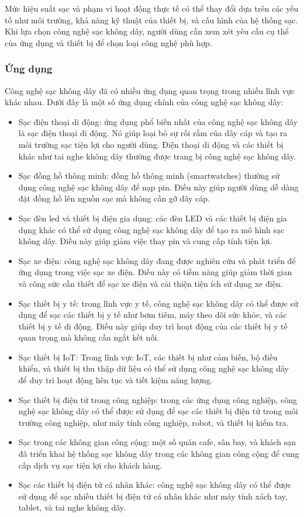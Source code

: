 \documentclass{article} %
\begin{document}
Mức hiệu suất sạc và phạm vi hoạt động thực tế có thể thay đổi dựa trên các yếu tố như môi trường, khả năng kỹ thuật của thiết bị, và cấu hình của hệ thống sạc. Khi lựa chọn công nghệ sạc không dây, người dùng cần xem xét yêu cầu cụ thể của ứng dụng và thiết bị để chọn loại công nghệ phù hợp.

\subsubsection{Ứng dụng}

Công nghệ sạc không dây đã có nhiều ứng dụng quan trọng trong nhiều lĩnh vực khác nhau. Dưới đây là một số ứng dụng chính của công nghệ sạc không dây:

\begin{itemize}
\item Sạc điện thoại di động: ứng dụng phổ biến nhất của công nghệ sạc không dây là sạc điện thoại di động. Nó giúp loại bỏ sự rối rắm của dây cáp và tạo ra môi trường sạc tiện lợi cho người dùng. Điện thoại di động và các thiết bị khác như tai nghe không dây thường được trang bị công nghệ sạc không dây.
\item Sạc đồng hồ thông minh: đồng hồ thông minh (smartwatches) thường sử dụng công nghệ sạc không dây để nạp pin. Điều này giúp người dùng dễ dàng đặt đồng hồ lên nguồn sạc mà không cần gỡ dây cáp.
\item Sạc đèn led và thiết bị điện gia dụng: các đèn LED và các thiết bị điện gia dụng khác có thể sử dụng công nghệ sạc không dây để tạo ra mô hình sạc không dây. Điều này giúp giảm việc thay pin và cung cấp tính tiện lợi.
\item Sạc xe điện: công nghệ sạc không dây đang được nghiên cứu và phát triển để ứng dụng trong việc sạc xe điện. Điều này có tiềm năng giúp giảm thời gian và công sức cần thiết để sạc xe điện và cải thiện tiện ích sử dụng xe điện.
\item Sạc thiết bị y tế: trong lĩnh vực y tế, công nghệ sạc không dây có thể được sử dụng để sạc các thiết bị y tế như bơm tiêm, máy theo dõi sức khỏe, và các thiết bị y tế di động. Điều này giúp duy trì hoạt động của các thiết bị y tế quan trọng mà không cần ngắt kết nối.
\item Sạc thiết bị IoT: Trong lĩnh vực IoT, các thiết bị như cảm biến, bộ điều khiển, và thiết bị thu thập dữ liệu có thể sử dụng công nghệ sạc không dây để duy trì hoạt động liên tục và tiết kiệm năng lượng.
\item Sạc thiết bị điện tử trong công nghiệp: trong các ứng dụng công nghiệp, công nghệ sạc không dây có thể được sử dụng để sạc các thiết bị điện tử trong môi trường công nghiệp, như máy tính công nghiệp, robot, và thiết bị kiểm tra.
\item Sạc trong các không gian công cộng: một số quán cafe, sân bay, và khách sạn đã triển khai hệ thống sạc không dây trong các không gian công cộng để cung cấp dịch vụ sạc tiện lợi cho khách hàng.
\item Sạc các thiết bị điện tử cá nhân khác: công nghệ sạc không dây có thể được sử dụng để sạc nhiều thiết bị điện tử cá nhân khác như máy tính xách tay, tablet, và tai nghe không dây.
\end{itemize}
\end{document}
